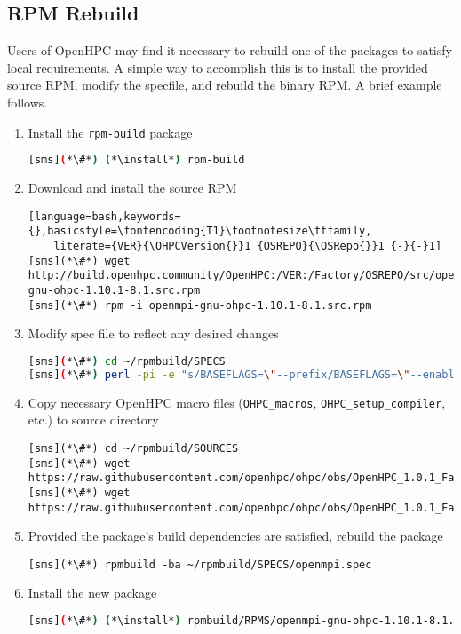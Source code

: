 \subsection{RPM Rebuild}  \label{appendix:rpmbuild}

Users of OpenHPC may find it necessary to rebuild one of the packages to satisfy
local requirements. A simple way to accomplish this is to install the provided
source RPM, modify the specfile, and rebuild the binary RPM. A brief example
follows.

\begin{enumerate}
\item Install the \texttt{rpm-build} package

\begin{lstlisting}[language=bash,keywords={}]
[sms](*\#*) (*\install*) rpm-build
\end{lstlisting}

\item Download and install the source RPM 
\begin{lstlisting}[language=bash,keywords={},basicstyle=\fontencoding{T1}\footnotesize\ttfamily,
    literate={VER}{\OHPCVersion{}}1 {OSREPO}{\OSRepo{}}1 {-}{-}1]
[sms](*\#*) wget http://build.openhpc.community/OpenHPC:/VER:/Factory/OSREPO/src/openmpi-gnu-ohpc-1.10.1-8.1.src.rpm
[sms](*\#*) rpm -i openmpi-gnu-ohpc-1.10.1-8.1.src.rpm
\end{lstlisting}

\item Modify spec file to reflect any desired changes

\begin{lstlisting}[language=bash,keywords={}]
[sms](*\#*) cd ~/rpmbuild/SPECS
[sms](*\#*) perl -pi -e "s/BASEFLAGS=\"--prefix/BASEFLAGS=\"--enable-mpi-thread-multiple --prefix/" openmpi.spec
\end{lstlisting}

\item Copy necessary OpenHPC macro files (\texttt{OHPC\_macros}, 
\texttt{OHPC\_setup\_compiler}, etc.) to source directory

\begin{lstlisting}
[sms](*\#*) cd ~/rpmbuild/SOURCES
[sms](*\#*) wget https://raw.githubusercontent.com/openhpc/ohpc/obs/OpenHPC_1.0.1_Factory/components/OHPC_macros
[sms](*\#*) wget https://raw.githubusercontent.com/openhpc/ohpc/obs/OpenHPC_1.0.1_Factory/components/OHPC_setup_compiler
\end{lstlisting}

\item Provided the package's build dependencies are satisfied, rebuild the
package

\begin{lstlisting}
[sms](*\#*) rpmbuild -ba ~/rpmbuild/SPECS/openmpi.spec
\end{lstlisting}

\item Install the new package

\begin{lstlisting}[language=bash,keywords={}]
[sms](*\#*) (*\install*) rpmbuild/RPMS/openmpi-gnu-ohpc-1.10.1-8.1.x86_64
\end{lstlisting}
\end{enumerate}
